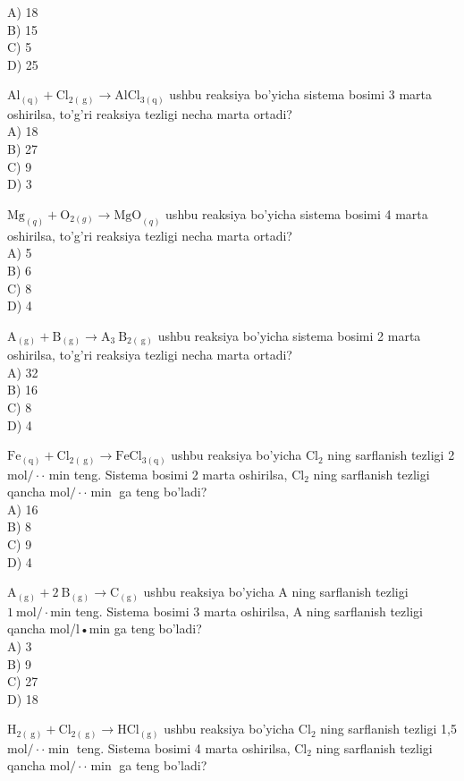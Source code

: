 A) 18\\
B) 15\\
C) 5\\
D) 25
  \item $\mathrm{Al}_{(\mathrm{q})}+\mathrm{Cl}_{2(\mathrm{~g})} \rightarrow \mathrm{AlCl}_{3(\mathrm{q})}$ ushbu reaksiya bo'yicha sistema bosimi 3 marta oshirilsa, to'g'ri reaksiya tezligi necha marta ortadi?\\
A) 18\\
B) 27\\
C) 9\\
D) 3
  \item $\mathrm{Mg}_{(q)}+\mathrm{O}_{2(g)} \rightarrow \mathrm{MgO}_{(q)}$ ushbu reaksiya bo'yicha sistema bosimi 4 marta oshirilsa, to'g'ri reaksiya tezligi necha marta ortadi?\\
A) 5\\
B) 6\\
C) 8\\
D) 4
  \item $\mathrm{A}_{(\mathrm{g})}+\mathrm{B}_{(\mathrm{g})} \rightarrow \mathrm{A}_{3} \mathrm{~B}_{2(\mathrm{~g})}$ ushbu reaksiya bo'yicha sistema bosimi 2 marta oshirilsa, to'g'ri reaksiya tezligi necha marta ortadi?\\
A) 32\\
B) 16\\
C) 8\\
D) 4
  \item $\mathrm{Fe}_{(\mathrm{q})}+\mathrm{Cl}_{2(\mathrm{~g})} \rightarrow \mathrm{FeCl}_{3(\mathrm{q})}$ ushbu reaksiya bo'yicha $\mathrm{Cl}_{2}$ ning sarflanish tezligi 2 $\mathrm{mol} / \cdot \cdot$ min teng. Sistema bosimi 2 marta oshirilsa, $\mathrm{Cl}_{2}$ ning sarflanish tezligi qancha $\mathrm{mol} / \cdot \cdot \min$ ga teng bo'ladi?\\
A) 16\\
B) 8\\
C) 9\\
D) 4
  \item $\mathrm{A}_{(\mathrm{g})}+2 \mathrm{~B}_{(\mathrm{g})} \rightarrow \mathrm{C}_{(\mathrm{g})}$ ushbu reaksiya bo'yicha A ning sarflanish tezligi $1 \mathrm{~mol} / \cdot \mathrm{min}$ teng. Sistema bosimi 3 marta oshirilsa, A ning sarflanish tezligi qancha mol/l•min ga teng bo'ladi?\\
A) 3\\
B) 9\\
C) 27\\
D) 18
  \item $\mathrm{H}_{2(\mathrm{~g})}+\mathrm{Cl}_{2(\mathrm{~g})} \rightarrow \mathrm{HCl}_{(\mathrm{g})}$ ushbu reaksiya bo'yicha $\mathrm{Cl}_{2}$ ning sarflanish tezligi 1,5 $\mathrm{mol} / \cdot \cdot \min$ teng. Sistema bosimi 4 marta oshirilsa, $\mathrm{Cl}_{2}$ ning sarflanish tezligi qancha $\mathrm{mol} / \cdot \cdot \min$ ga teng bo'ladi?\\
